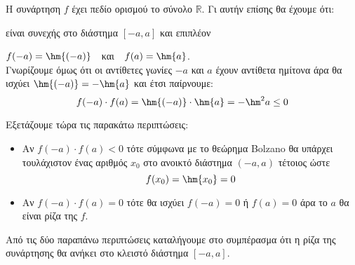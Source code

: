 Η συνάρτηση $ f $ έχει πεδίο ορισμού το σύνολο $ \mathbb{R} $. Γι αυτήν επίσης θα έχουμε ότι:
\begin{rlist}
\item είναι συνεχής στο διάστημα $ [-a,a] $ και επιπλέον
\item $ f(-a)=\hm{(-a)} $\ \ και\ \ 
$ f(a)=\hm{a} $.\\
Γνωρίζουμε όμως ότι οι αντίθετες γωνίες $ -a $ και $ a $ έχουν αντίθετα ημίτονα άρα θα ισχύει $ \hm{(-a)}=-\hm{a} $ και έτσι παίρνουμε:
\[ f(-a)\cdot f(a)=\hm{(-a)}\cdot\hm{a}=-\hm^2{a}\leq0 \]
\end{rlist}
Εξετάζουμε τώρα τις παρακάτω περιπτώσεις:
\begin{itemize}
\item Αν $ f(-a)\cdot f(a)<0 $ τότε σύμφωνα με το θεώρημα Bolzano θα υπάρχει τουλάχιστον ένας αριθμός $ x_0 $ στο ανοικτό διάστημα $ (-a,a) $ τέτοιος ώστε
\[ f(x_0)=\hm{x_0}=0 \]
\item Αν $ f(-a)\cdot f(a)=0 $ τότε θα ισχύει $ f(-a)=0 $ ή $ f(a)=0 $ άρα το $ a $ θα είναι ρίζα της $ f $.
\end{itemize}
Από τις δύο παραπάνω περιπτώσεις καταλήγουμε στο συμπέρασμα ότι η ρίζα της συνάρτησης θα ανήκει στο κλειστό διάστημα $ [-a,a] $.
